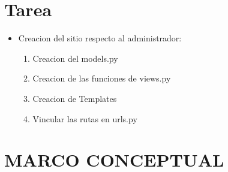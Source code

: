 \documentclass{article}
\begin{document}
	\section{Tarea}
	\begin{itemize}
		\item Creacion del sitio respecto al administrador:
        \begin{enumerate}
            \item Creacion del models.py
            \item Creacion de las funciones de views.py
            \item Creacion de Templates
            \item Vincular las rutas en urls.py
        \end{enumerate}
        \end{itemize}
	\section{MARCO CONCEPTUAL}
\end{document}
